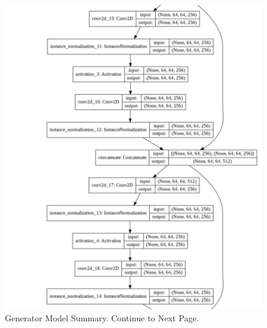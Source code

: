 \begin{figure}[H]
        \vspace*{4cm}
	    \begin{center} 
	    \includegraphics[scale=0.40]{images/Appendix/generator_2.png}
	     \caption{Generator Model Summary. Continue to Next Page.}
	    \end{center}
\end{figure}

